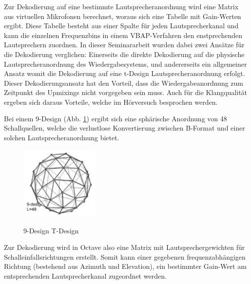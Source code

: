 Zur Dekodierung auf eine bestimmte Lautsprecheranordnung wird eine Matrix aus virtuellen Mikrofonen berechnet, woraus sich eine Tabelle mit Gain-Werten ergibt. Diese Tabelle besteht aus einer Spalte für jeden Lautsprecherkanal und kann die einzelnen Frequenzbins in einem VBAP-Verfahren den enstprechenden Lautsprechern zuordnen. In dieser Seminararbeit wurden dabei zwei Ansätze für die Dekodierung verglichen: Einerseits die direkte Dekodierung auf die physische Lautsprecheranordnung des Wiedergabesystems, und andererseits ein allgemeiner Ansatz womit die Dekodierung auf eine t-Design Lautsprecheranordnung erfolgt. Dieser Dekodierungsansatz hat den Vorteil, dass die Wiedergabeanordnung zum Zeitpunkt des Upmixings nicht vorgegeben sein muss. Auch für die Klangqualität ergeben sich daraus Vorteile, welche im Hörversuch besprochen werden.

Bei einem 9-Design (Abb. \ref{fig:tdesign}) ergibt sich eine sphärische Anordnung von 48 Schallquellen, welche die verlustlose Konvertierung zwischen B-Format und einer solchen Lautsprecheranordnung bietet.

\begin{figure}[!ht]
  \centering
  \includegraphics[width=0.35\textwidth]{implementierung/plots/t-design.png}
  \label{fig:tdesign}
  \caption{9-Design T-Design\protect\footnotemark}
\end{figure}


Zur Dekodierung wird in Octave also eine Matrix mit Lautsprechergewichten für Schalleinfallsrichtungen erstellt. Somit kann einer gegebenen frequenzabhängigen Richtung (bestehend aus Azimuth und Elevation), ein bestimmter Gain-Wert am entsprechenden Lautsprecherkanal zugeordnet werden.
